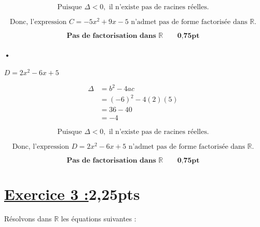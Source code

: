 \documentclass[12pt,a4paper]{article}
\begin{document}
\begin{enumerate}
\[
\text{Puisque } \Delta < 0, \text{ il n'existe pas de racines réelles.}
\]

\[
\text{Donc, l'expression } C = -5x^2 + 9x - 5 \text{ n'admet pas de forme factorisée dans } \mathbb{R}.
\]

\begin{tcolorbox}[colback=yellow!20, colframe=black, sharp corners]
    \[
    \mathbf{\text{Pas de factorisation dans } \mathbb{R}}\quad\quad \textbf{0,75pt}
    \]
\end{tcolorbox}

\paragraph{•}
\(
D = 2x^2 - 6x + 5
\)

\[
\begin{aligned}
\Delta &= b^2 - 4ac \\
       &= (-6)^2 - 4(2)(5) \\
       &= 36 - 40 \\
       &= -4
\end{aligned}
\]

\[
\text{Puisque } \Delta < 0, \text{ il n'existe pas de racines réelles.}
\]

\[
\text{Donc, l'expression } D = 2x^2 - 6x + 5 \text{ n'admet pas de forme factorisée dans } \mathbb{R}.
\]

\begin{tcolorbox}[colback=yellow!20, colframe=black, sharp corners]
    \[
    \mathbf{\text{Pas de factorisation dans } \mathbb{R}}\quad\quad \textbf{0,75pt}
    \]
\end{tcolorbox}

\end{enumerate}

\section*{\underline{Exercice 3 :}2,25pts}

Résolvons dans \( \mathbb{R} \) les équations suivantes :
\end{document}
